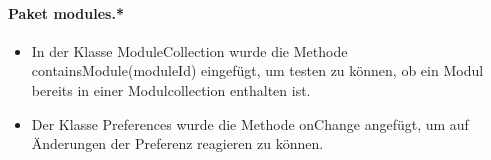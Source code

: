 \paragraph{Paket modules.*} 
\begin{itemize} [nosep]
\item In der Klasse ModuleCollection wurde die Methode containsModule(moduleId) eingefügt, um testen zu können, ob ein Modul bereits in einer Modulcollection enthalten ist. 
\item Der Klasse Preferences wurde die Methode onChange angefügt, um auf Änderungen der Preferenz reagieren zu können.
\end  {itemize}